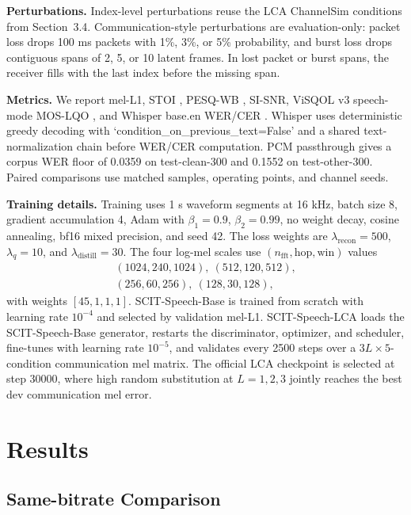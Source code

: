 \documentclass[10pt,twocolumn]{article}
\newcommand{\base}{SCIT-Speech-Base}
\newcommand{\lca}{SCIT-Speech-LCA}
\begin{document}
\textbf{Perturbations.}
Index-level perturbations reuse the LCA ChannelSim conditions from Section~3.4. Communication-style perturbations are evaluation-only: packet loss drops 100 ms packets with 1\%, 3\%, or 5\% probability, and burst loss drops contiguous spans of 2, 5, or 10 latent frames. In lost packet or burst spans, the receiver fills with the last index before the missing span.

\textbf{Metrics.}
We report mel-L1, STOI \cite{taal2011stoi}, PESQ-WB \cite{itu2001pesq}, SI-SNR, ViSQOL v3 speech-mode MOS-LQO \cite{chinen2020visqol}, and Whisper base.en WER/CER \cite{radford2022whisper}. Whisper uses deterministic greedy decoding with `condition\_on\_previous\_text=False' and a shared text-normalization chain before WER/CER computation. PCM passthrough gives a corpus WER floor of 0.0359 on test-clean-300 and 0.1552 on test-other-300. Paired comparisons use matched samples, operating points, and channel seeds.

\textbf{Training details.}
Training uses 1 s waveform segments at 16 kHz, batch size 8, gradient accumulation 4, Adam with \(\beta_1=0.9\), \(\beta_2=0.99\), no weight decay, cosine annealing, bf16 mixed precision, and seed 42. The loss weights are \(\lambda_{\mathrm{recon}}=500\), \(\lambda_q=10\), and \(\lambda_{\mathrm{distill}}=30\). The four log-mel scales use \((n_{\mathrm{fft}},\mathrm{hop},\mathrm{win})\) values
\[
\begin{gathered}
(1024,240,1024),\ (512,120,512),\\
(256,60,256),\ (128,30,128),
\end{gathered}
\]
with weights \([45,1,1,1]\). \base{} is trained from scratch with learning rate \(10^{-4}\) and selected by validation mel-L1. \lca{} loads the \base{} generator, restarts the discriminator, optimizer, and scheduler, fine-tunes with learning rate \(10^{-5}\), and validates every 2500 steps over a \(3L\times5\)-condition communication mel matrix. The official LCA checkpoint is selected at step 30000, where high random substitution at \(L=1,2,3\) jointly reaches the best dev communication mel error.

\section{Results}

\subsection{Same-bitrate Comparison}
\end{document}

